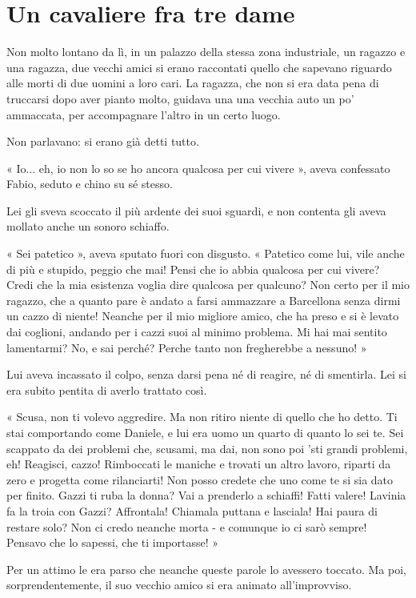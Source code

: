 \chapter{Un cavaliere fra tre dame}

Non molto lontano da lì, in un palazzo della stessa zona industriale, un ragazzo e una ragazza, due vecchi amici si erano raccontati quello che sapevano riguardo alle morti di due uomini a loro cari. La ragazza, che non si era data pena di truccarsi dopo aver pianto molto, guidava una una vecchia auto un po' ammaccata, per accompagnare l'altro in un certo luogo. 

Non parlavano: si erano già detti tutto.

« Io... eh, io non lo so se ho ancora qualcosa per cui vivere », aveva confessato Fabio, seduto e chino su sé stesso.

Lei gli sveva scoccato il più ardente dei suoi sguardi, e non contenta gli aveva mollato anche un sonoro schiaffo.

« Sei patetico », aveva sputato fuori con disgusto. « Patetico come lui, vile anche di più e stupido, peggio che mai! Pensi che io abbia qualcosa per cui vivere? Credi che la mia esistenza voglia dire qualcosa per qualcuno? Non certo per il mio ragazzo, che a quanto pare è andato a farsi ammazzare a Barcellona senza dirmi un cazzo di niente! Neanche per il mio migliore amico, che ha preso e si è levato dai coglioni, andando per i cazzi suoi al minimo problema. Mi hai mai sentito lamentarmi? No, e sai perché? Perche tanto non fregherebbe a nessuno! »

Lui aveva incassato il colpo, senza darsi pena né di reagire, né di smentirla. Lei si era subito pentita di averlo trattato così. 

« Scusa, non ti volevo aggredire. Ma non ritiro niente di quello che ho detto. Ti stai comportando come Daniele, e lui era uomo un quarto di quanto lo sei te. Sei scappato da dei problemi che, scusami, ma dai, non sono poi 'sti grandi problemi, eh! Reagisci, cazzo! Rimboccati le maniche e trovati un altro lavoro, riparti da zero e progetta come rilanciarti! Non posso credete che uno come te si sia dato per finito. Gazzi ti ruba la donna? Vai a prenderlo a schiaffi! Fatti valere! Lavinia fa la troia con Gazzi? Affrontala! Chiamala puttana e lasciala! Hai paura di restare solo? Non ci credo neanche morta - e comunque io ci sarò sempre! Pensavo che lo sapessi, che ti importasse! »

Per un attimo le era parso che neanche queste parole lo avessero toccato. Ma poi, sorprendentemente, il suo vecchio amico si era animato all'improvviso.

